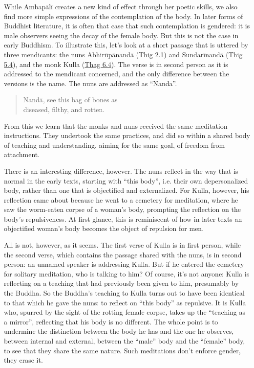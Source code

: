 \documentclass[12pt,openany]{book}%
\begin{document}
While \textsanskrit{Ambapālī} creates a new kind of effect through her poetic skills, we also find more simple expressions of the contemplation of the body. In later forms of Buddhist literature, it is often that case that such contemplation is gendered: it is male observers seeing the decay of the female body. But this is not the case in early Buddhism. To illustrate this, let’s look at a short passage that is uttered by three mendicants: the nuns \textsanskrit{Abhirūpānandā} (\href{https://suttacentral.net/thig2.1/en/sujato}{Thig 2.1}) and \textsanskrit{Sundarīnandā} (\href{https://suttacentral.net/thig5.4/en/sujato}{Thig 5.4}), and the monk Kulla (\href{https://suttacentral.net/thag6.4}{Thag 6.4}). The verse is in second person as it is addressed to the mendicant concerned, and the only difference between the versions is the name. The nuns are addressed as “\textsanskrit{Nandā}”.

\begin{quotation}%
\textsanskrit{Nandā}, see this bag of bones as \\
diseased, filthy, and rotten.

%
\end{quotation}

From this we learn that the monks and nuns received the same meditation instructions. They undertook the same practices, and did so within a shared body of teaching and understanding, aiming for the same goal, of freedom from attachment.

There is an interesting difference, however. The nuns reflect in the way that is normal in the early texts, starting with “this body”, i.e. their own depersonalized body, rather than one that is objectified and externalized. For Kulla, however, his reflection came about because he went to a cemetery for meditation, where he saw the worm-eaten corpse of a woman’s body, prompting the reflection on the body’s repulsiveness. At first glance, this is reminiscent of how in later texts an objectified woman’s body becomes the object of repulsion for men.

All is not, however, as it seems. The first verse of Kulla is in first person, while the second verse, which contains the passage shared with the nuns, is in second person: an unnamed speaker is addressing Kulla. But if he entered the cemetery for solitary meditation, who is talking to him? Of course, it’s not anyone: Kulla is reflecting on a teaching that had previously been given to him, presumably by the Buddha. So the Buddha’s teaching to Kulla turns out to have been identical to that which he gave the nuns: to reflect on “this body” as repulsive. It is Kulla who, spurred by the sight of the rotting female corpse, takes up the “teaching as a mirror”, reflecting that his body is no different. The whole point is to undermine the distinction between the body he has and the one he observes, between internal and external, between the “male” body and the “female” body, to see that they share the same nature. Such meditations don’t enforce gender, they erase it.
\end{document}
